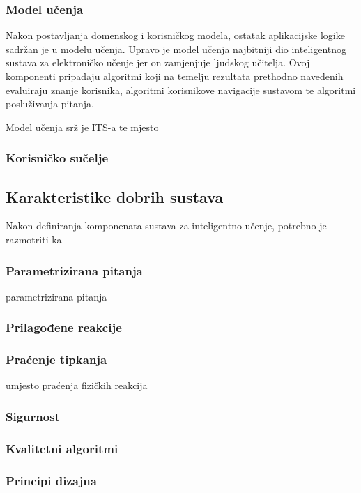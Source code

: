 \documentclass[times, utf8, zavrsni]{fer}
\begin{document}
\subsubsection{Model učenja}
Nakon postavljanja domenskog i korisničkog modela, ostatak aplikacijske logike sadržan je u modelu učenja. Upravo je model učenja najbitniji dio inteligentnog sustava za elektroničko učenje jer on zamjenjuje ljudskog učitelja. Ovoj komponenti pripadaju algoritmi koji na temelju rezultata prethodno navedenih evaluiraju znanje korisnika, algoritmi korisnikove navigacije sustavom te algoritmi posluživanja pitanja.
\par
Model učenja srž je ITS-a te mjesto 

\subsubsection{Korisničko sučelje}


\subsection{Karakteristike dobrih sustava}
Nakon definiranja komponenata sustava za inteligentno učenje, potrebno je razmotriti ka

\subsubsection{Parametrizirana pitanja} parametrizirana pitanja

\subsubsection{Prilagođene reakcije}

\subsubsection{Praćenje tipkanja}
umjesto praćenja fizičkih reakcija

\subsubsection{Sigurnost}

\subsubsection{Kvalitetni algoritmi}

\subsubsection{Principi dizajna}
\end{document}
